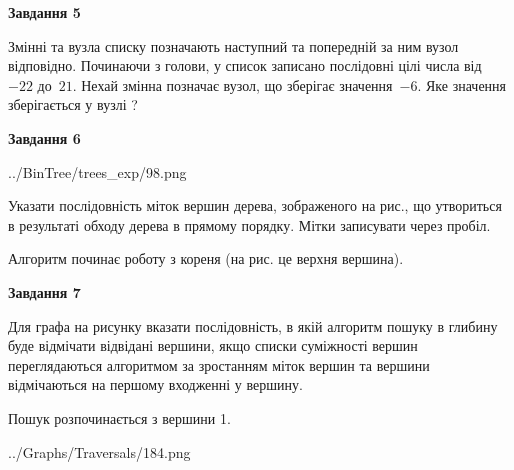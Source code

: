\documentclass[12pt, ukrainian]{article}
\begin{document}
{\begin {large}
{\begin {center}\textbf{Завдання 5}\end {center}}\par
Змінні  та  вузла списку позначають наступний та попередній за ним вузол відповідно. Починаючи з голови, у список записано послідовні цілі числа від~$-22$ до~$21$. Нехай змінна  позначає вузол, що зберігає значення~$-6$.
Яке значення зберігається у вузлі  ?\par
\newpage

{\begin {center}\textbf{Завдання 6}\end {center}}\par

\begin{center}
	{../BinTree/trees_exp/98.png}
\end{center}
Указати послідовність міток вершин дерева, зображеного на рис., що утвориться в результаті обходу дерева в прямому порядку. Мітки записувати через пробіл.\par Алгоритм починає роботу з кореня (на рис. це верхня вершина).\par
\newpage

{\begin {center}\textbf{Завдання 7}\end {center}}\par
Для графа на рисунку вказати послідовність, в якій алгоритм пошуку в глибину буде відмічати відвідані вершини, якщо списки суміжності вершин переглядаються алгоритмом за зростанням міток вершин та вершини відмічаються на першому вход\-женні у вершину.\par
Пошук розпочинається з вершини 1.\par

\begin{center}
	{../Graphs/Traversals/184.png}
\end{center}\par
\newpage


\end{large}}
\end{document}
